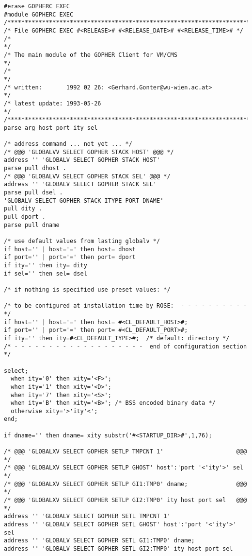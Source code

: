 \begin{verbatim}
#erase GOPHERC EXEC
#module GOPHERC EXEC
/***********************************************************************/
/* File GOPHERC EXEC #<RELEASE># #<RELEASE_DATE># #<RELEASE_TIME># */
/*                                                                     */
/* The main module of the GOPHER Client for VM/CMS                     */
/*                                                                     */
/* written:       1992 02 26: <Gerhard.Gonter@wu-wien.ac.at>           */
/* latest update: 1993-05-26                                           */
/***********************************************************************/
parse arg host port ity sel

/* address command ... not yet ... */
/* @@@ 'GLOBALVV SELECT GOPHER STACK HOST' @@@ */
address '' 'GLOBALV SELECT GOPHER STACK HOST'
parse pull dhost .
/* @@@ 'GLOBALVV SELECT GOPHER STACK SEL' @@@ */
address '' 'GLOBALV SELECT GOPHER STACK SEL'
parse pull dsel .
'GLOBALV SELECT GOPHER STACK ITYPE PORT DNAME'
pull dity .
pull dport .
parse pull dname

/* use default values from lasting globalv */
if host='' | host='=' then host= dhost
if port='' | port='=' then port= dport
if ity='' then ity= dity
if sel='' then sel= dsel

/* if nothing is specified use preset values: */

/* to be configured at installation time by ROSE:  - - - - - - - - - - */
if host='' | host='=' then host= #<CL_DEFAULT_HOST>#;
if port='' | port='=' then port= #<CL_DEFAULT_PORT>#;
if ity='' then ity=#<CL_DEFAULT_TYPE>#;  /* default: directory */
/* - - - - - - - - - - - - - - - - - - -  end of configuration section */

select;
  when ity='0' then xity='<F>';
  when ity='1' then xity='<D>';
  when ity='7' then xity='<S>';
  when ity='B' then xity='<B>'; /* BSS encoded binary data */
  otherwise xity='>'ity'<';
end;

if dname='' then dname= xity substr('#<STARTUP_DIR>#',1,76);

/* @@@ 'GLOBALXV SELECT GOPHER SETLP TMPCNT 1'                     @@@ */
/* @@@ 'GLOBALXV SELECT GOPHER SETLP GHOST' host':'port '<'ity'>' sel  */
/* @@@ 'GLOBALXV SELECT GOPHER SETLP GI1:TMP0' dname;              @@@ */
/* @@@ 'GLOBALXV SELECT GOPHER SETLP GI2:TMP0' ity host port sel   @@@ */
address '' 'GLOBALV SELECT GOPHER SETL TMPCNT 1'
address '' 'GLOBALV SELECT GOPHER SETL GHOST' host':'port '<'ity'>' sel
address '' 'GLOBALV SELECT GOPHER SETL GI1:TMP0' dname;
address '' 'GLOBALV SELECT GOPHER SETL GI2:TMP0' ity host port sel


\end{verbatim}
